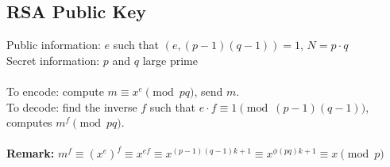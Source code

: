 \documentclass[12pt]{article}
\begin{document}
\subsection*{RSA Public Key}
Public information: $e$ such that $(e,(p-1)(q-1))=1$, $N=p\cdot q$\\
Secret information: $p$ and $q$ large prime\\
\\
To encode: compute $m\equiv x^e\pmod {pq}$, send $m$.\\
To decode: find the inverse $f$ such that $e\cdot f\equiv 1\pmod {(p-1)(q-1)}$, computes $m^f\pmod {pq}$.\\
\\
\textbf{Remark:} $m^f\equiv (x^e)^f\equiv x^{ef}\equiv x^{(p-1)(q-1)k+1}\equiv x^{\phi(pq)k+1}\equiv x\pmod p$


\end{document}

